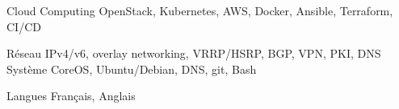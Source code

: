 

\begin{cvskills}

  \cvskill
    {Cloud Computing}
    {OpenStack, Kubernetes, AWS, Docker, Ansible, Terraform, CI/CD}

  \cvskill
    {Réseau}
    {IPv4/v6, overlay networking, VRRP/HSRP, BGP, VPN, PKI, DNS}
  \cvskill
    {Système}
    {CoreOS, Ubuntu/Debian, DNS, git, Bash}


  \cvskill
    {Langues} %
    {Français, Anglais} %

\end{cvskills}
